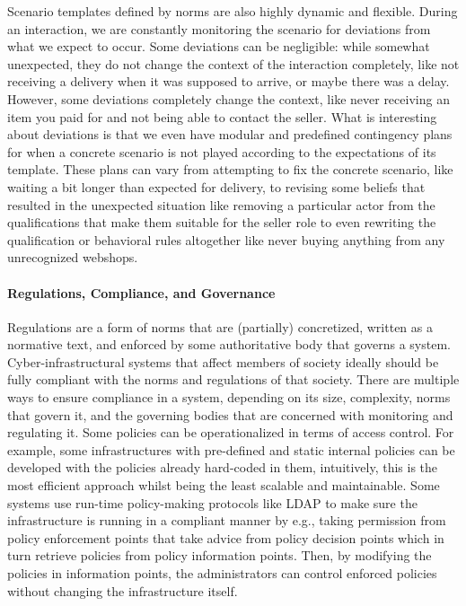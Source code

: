 Scenario templates defined by norms are also highly dynamic and flexible. During an interaction, we are constantly monitoring the scenario for deviations from what we expect to occur. Some deviations can be negligible: while somewhat unexpected, they do not change the context of the interaction completely, like not receiving a delivery when it was supposed to arrive, or maybe there was a delay. However, some deviations completely change the context, like never receiving an item you paid for and not being able to contact the seller. What is interesting about deviations is that we even have modular and predefined contingency plans for when a concrete scenario is not played according to the expectations of its template. These plans can vary from attempting to fix the concrete scenario, like waiting a bit longer than expected for delivery, to revising some beliefs that resulted in the unexpected situation like removing a particular actor from the qualifications that make them suitable for the seller role to even rewriting the qualification or behavioral rules altogether like never buying anything from any unrecognized webshops.

\paragraph{Regulations, Compliance, and Governance}
Regulations are a form of norms that are (partially) concretized, written as a normative text, and enforced by some authoritative body that governs a system.  Cyber-infrastructural systems that affect members of society ideally should be fully compliant with the norms and regulations of that society. There are multiple ways to ensure compliance in a system, depending on its size, complexity, norms that govern it, and the governing bodies that are concerned with monitoring and regulating it. Some policies can be operationalized in terms of access control. For example, some infrastructures with pre-defined and static internal policies can be developed with the policies already hard-coded in them, intuitively, this is the most efficient approach whilst being the least scalable and maintainable. Some systems use run-time policy-making protocols like LDAP to make sure the infrastructure is running in a compliant manner by e.g., taking permission from policy enforcement points that take advice from policy decision points which in turn retrieve policies from policy information points. Then, by modifying the policies in information points, the administrators can control enforced policies without changing the infrastructure itself. 

